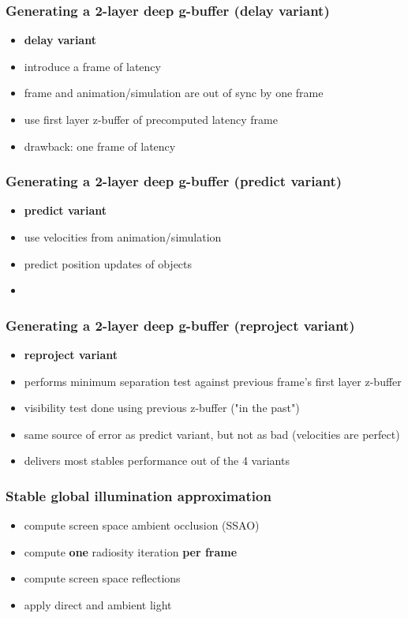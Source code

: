 \documentclass[aspectratio=169]{beamer}
\begin{document}
	\begin{frame}
		\frametitle{Generating a 2-layer deep g-buffer (delay variant)}
		\begin{itemize}
			\item \textbf{delay variant}
			\item introduce a frame of latency
			\item frame and animation/simulation are out of sync by one frame
			\item use first layer z-buffer of precomputed latency frame 
			\item drawback: one frame of latency
		\end{itemize}
	\end{frame}	

	\begin{frame}
		\frametitle{Generating a 2-layer deep g-buffer (predict variant)}
		\begin{itemize}
			\item \textbf{predict variant}
			\item use velocities from animation/simulation
			\item predict position updates of objects
			\item 
		\end{itemize}
	\end{frame}	

	\begin{frame}
		\frametitle{Generating a 2-layer deep g-buffer (reproject variant)}
		\begin{itemize}
			\item \textbf{reproject variant}
			\item performs minimum separation test against previous frame's first layer z-buffer
			\item visibility test done using previous z-buffer ("in the past")
			\item same source of error as predict variant, but not as bad (velocities are perfect)
			\item delivers most stables performance out of the 4 variants
			
		\end{itemize}
	\end{frame}	

	\begin{frame}
		\frametitle{Stable global illumination approximation}
		\begin{itemize}
			\item compute screen space ambient occlusion (SSAO) 
			\item compute \textbf{one} radiosity iteration \textbf{per frame}
			\item compute screen space reflections
			\item apply direct and ambient light
		\end{itemize}
	\end{frame}	
\end{document}
